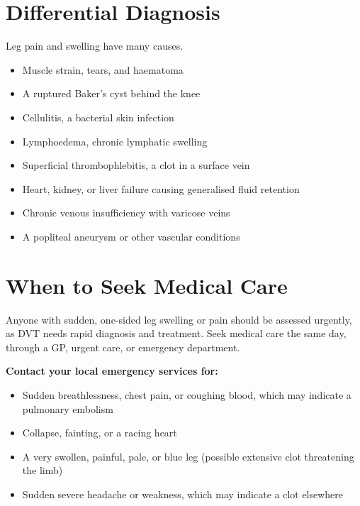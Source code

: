 \section*{Differential Diagnosis}
Leg pain and swelling have many causes.
\begin{itemize}
    \item Muscle strain, tears, and haematoma
    \item A ruptured Baker's cyst behind the knee
    \item Cellulitis, a bacterial skin infection
    \item Lymphoedema, chronic lymphatic swelling
    \item Superficial thrombophlebitis, a clot in a surface vein
    \item Heart, kidney, or liver failure causing generalised fluid retention
    \item Chronic venous insufficiency with varicose veins
    \item A popliteal aneurysm or other vascular conditions
\end{itemize}

\section*{When to Seek Medical Care}
Anyone with sudden, one-sided leg swelling or pain should be assessed urgently, as DVT needs rapid diagnosis and treatment. Seek medical care the same day, through a GP, urgent care, or emergency department.

\textbf{Contact your local emergency services for:}
\begin{itemize}
    \item Sudden breathlessness, chest pain, or coughing blood, which may indicate a pulmonary embolism
    \item Collapse, fainting, or a racing heart
    \item A very swollen, painful, pale, or blue leg (possible extensive clot threatening the limb)
    \item Sudden severe headache or weakness, which may indicate a clot elsewhere
\end{itemize}

